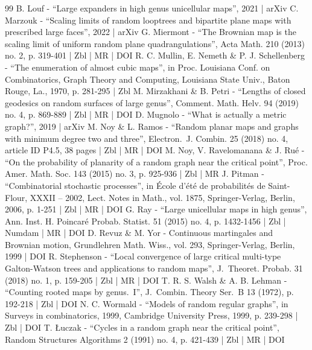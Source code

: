 \documentclass[10pt]{amsart}
\theoremstyle{plain}
\theoremstyle{definition}
\theoremstyle{remark}
\begin{document}
\begin{thebibliography}{99}
B. Louf - “Large expanders in high genus unicellular maps”, 2021 | arXiv
C. Marzouk - “Scaling limits of random looptrees and bipartite plane maps with prescribed large faces”, 2022 | arXiv
G. Miermont - “The Brownian map is the scaling limit of uniform random plane quadrangulations”, Acta Math. 210 (2013) no. 2, p. 319-401 | Zbl | MR | DOI
R. C. Mullin, E. Nemeth \& P. J. Schellenberg - “The enumeration of almost cubic maps”, in Proc. Louisiana Conf. on Combinatorics, Graph Theory and Computing, Louisiana State Univ., Baton Rouge, La., 1970, p. 281-295 | Zbl
M. Mirzakhani \& B. Petri - “Lengths of closed geodesics on random surfaces of large genus”, Comment. Math. Helv. 94 (2019) no. 4, p. 869-889 | Zbl | MR | DOI
D. Mugnolo - “What is actually a metric graph?”, 2019 | arXiv
M. Noy \& L. Ramos - “Random planar maps and graphs with minimum degree two and three”, Electron. J. Combin. 25 (2018) no. 4, article ID P4.5, 38 pages | Zbl | MR | DOI
M. Noy, V. Ravelomanana \& J. Rué - “On the probability of planarity of a random graph near the critical point”, Proc. Amer. Math. Soc. 143 (2015) no. 3, p. 925-936 | Zbl | MR
J. Pitman - “Combinatorial stochastic processes”, in École d’été de probabilités de Saint-Flour, XXXII – 2002, Lect. Notes in Math., vol. 1875, Springer-Verlag, Berlin, 2006, p. 1-251 | Zbl | MR | DOI
G. Ray - “Large unicellular maps in high genus”, Ann. Inst. H. Poincaré Probab. Statist. 51 (2015) no. 4, p. 1432-1456 | Zbl | Numdam | MR | DOI
D. Revuz \& M. Yor - Continuous martingales and Brownian motion, Grundlehren Math. Wiss., vol. 293, Springer-Verlag, Berlin, 1999 | DOI
R. Stephenson - “Local convergence of large critical multi-type Galton-Watson trees and applications to random maps”, J. Theoret. Probab. 31 (2018) no. 1, p. 159-205 | Zbl | MR | DOI
T. R. S. Walsh \& A. B. Lehman - “Counting rooted maps by genus. I”, J. Combin. Theory Ser. B 13 (1972), p. 192-218 | Zbl | DOI
N. C. Wormald - “Models of random regular graphs”, in Surveys in combinatorics, 1999, Cambridge University Press, 1999, p. 239-298 | Zbl | DOI
T. Łuczak - “Cycles in a random graph near the critical point”, Random Structures Algorithms 2 (1991) no. 4, p. 421-439 | Zbl | MR | DOI
\end{thebibliography}
\end{document}
